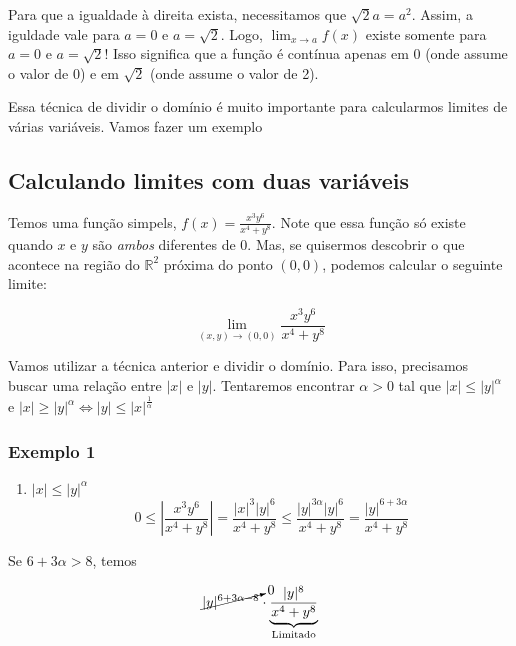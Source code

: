 \documentclass[
  letterpaper,
  DIV=11,
  numbers=noendperiod]{scrreprt}
\providecommand{\tightlist}{%
  \setlength{\itemsep}{0pt}\setlength{\parskip}{0pt}}\usepackage{longtable,booktabs,array}
\begin{document}
Para que a igualdade à direita exista, necessitamos que
\(\sqrt{2}a = a^2\). Assim, a iguldade vale para \(a=0\) e
\(a=\sqrt{2}\). Logo, \(\lim_{x\rightarrow a} f(x)\) existe somente para
\(a=0\) e \(a=\sqrt{2}\)! Isso significa que a função é contínua apenas
em \(0\) (onde assume o valor de 0) e em \(\sqrt{2}\) (onde assume o
valor de 2).

Essa técnica de dividir o domínio é muito importante para calcularmos
limites de várias variáveis. Vamos fazer um exemplo

\subsection{Calculando limites com duas
variáveis}\label{calculando-limites-com-duas-variuxe1veis}

Temos uma função simpels, \(f(x) = \frac{x^3y^6}{x^4+y^8}\). Note que
essa função só existe quando \(x\) e \(y\) são \emph{ambos} diferentes
de 0. Mas, se quisermos descobrir o que acontece na região do
\(\mathbb{R}^2\) próxima do ponto \((0,0)\), podemos calcular o seguinte
limite:

\[
\lim_{(x,y) \rightarrow (0,0)} \frac{x^3y^6}{x^4+y^8}
\]

Vamos utilizar a técnica anterior e dividir o domínio. Para isso,
precisamos buscar uma relação entre \(\lvert x \rvert\) e
\(\lvert y \rvert\). Tentaremos encontrar \(\alpha > 0\) tal que
\(\lvert x \rvert \leq \lvert y \rvert^\alpha\) e
\(\lvert x \rvert \geq \lvert y \rvert^{\alpha} \Leftrightarrow \lvert y \rvert \leq \lvert x \rvert^{\frac{1}{\alpha}}\)

\subsubsection{Exemplo 1}\label{exemplo-1}

\begin{enumerate}
\def\labelenumi{\arabic{enumi}.}
\tightlist
\item
  \(\lvert x \rvert \leq \lvert y \rvert^{\alpha}\) \[
  0 \leq \left\lvert \frac{x^3y^6}{x^4+y^8} \right\rvert = \frac{\lvert x \rvert^3 \lvert y \rvert^6}
  {x^4+y^8} \leq \frac{\lvert y \rvert ^{3\alpha} \lvert y \rvert^6}{x^4 + y^8} =
  \frac{\lvert y \rvert^{6+3\alpha}}{x^4 + y^8}
  \]
\end{enumerate}

Se \(6+3\alpha > 8\), temos

\[
\cancelto{0}{\lvert y \rvert^{6+3\alpha-8}} \cdot
\underbrace{\frac{\lvert y \rvert^{8}}{x^4+y^8}}_{\text{Limitado}}
\]
\end{document}
